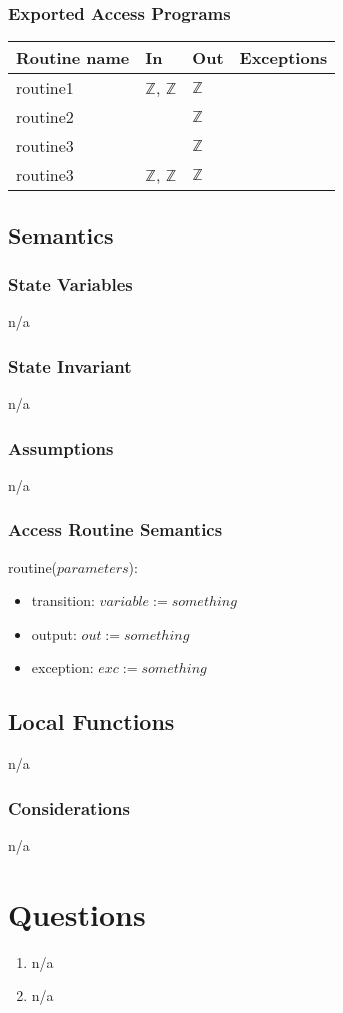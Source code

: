 \documentclass[12pt]{article}
\begin{document}
\subsubsection* {Exported Access Programs}
\begin{tabular}{| l | l | l | l |}
\hline
\textbf{Routine name} & \textbf{In} & \textbf{Out} & \textbf{Exceptions}\\
\hline
routine1 & $\mathbb{Z}$, $\mathbb{Z}$ & $\mathbb{Z}$ & \\
\hline
routine2 & ~ & $\mathbb{Z}$ & ~\\
\hline
routine3 & ~ & $\mathbb{Z}$ & ~\\
\hline
routine3 & $\mathbb{Z}$, $\mathbb{Z}$ & $\mathbb{Z}$ & ~\\
\hline
\end{tabular}


\subsection* {Semantics}
\subsubsection* {State Variables}
n/a

\subsubsection* {State Invariant}
n/a

\subsubsection* {Assumptions}
n/a

\subsubsection* {Access Routine Semantics}
\noindent routine($parameters$):
\begin{itemize}
    \item transition: $variable := something$
    \item output: $out := something$
    \item exception: $exc := something$
\end{itemize}


\subsection*{Local Functions}
n/a


\subsubsection* {Considerations}
n/a



\newpage
\section* {Questions}
\begin{enumerate}
    \item n/a
    \item n/a
\end{enumerate}
\end{document}
